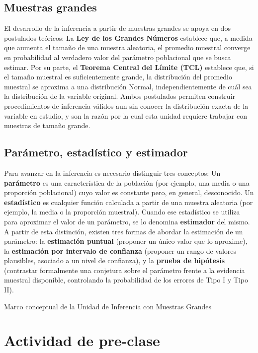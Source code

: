 \documentclass[
  spanish,
  letterpaper,
  DIV=11,
  numbers=noendperiod]{scrreprt}
\begin{document}
\subsection{Muestras grandes}\label{muestras-grandes}

El desarrollo de la inferencia a partir de muestras grandes se apoya en
dos postulados teóricos: La \textbf{Ley de los Grandes Números}
establece que, a medida que aumenta el tamaño de una muestra aleatoria,
el promedio muestral converge en probabilidad al verdadero valor del
parámetro poblacional que se busca estimar. Por su parte, el
\textbf{Teorema Central del Límite (TCL)} establece que, si el tamaño
muestral es suficientemente grande, la distribución del promedio
muestral se aproxima a una distribución Normal, independientemente de
cuál sea la distribución de la variable original. Ambos postulados
permiten construir procedimientos de inferencia válidos aun sin conocer
la distribución exacta de la variable en estudio, y son la razón por la
cual esta unidad requiere trabajar con muestras de tamaño grande.

\subsection{Parámetro, estadístico y
estimador}\label{paruxe1metro-estaduxedstico-y-estimador}

Para avanzar en la inferencia es necesario distinguir tres conceptos: Un
\textbf{parámetro} es una característica de la población (por ejemplo,
una media o una proporción poblacional) cuyo valor es constante pero, en
general, desconocido. Un \textbf{estadístico} es cualquier función
calculada a partir de una muestra aleatoria (por ejemplo, la media o la
proporción muestral). Cuando ese estadístico se utiliza para aproximar
el valor de un parámetro, se lo denomina \textbf{estimador} del mismo. A
partir de esta distinción, existen tres formas de abordar la estimación
de un parámetro: la \textbf{estimación puntual} (proponer un único valor
que lo aproxime), la \textbf{estimación por intervalo de confianza}
(proponer un rango de valores plausibles, asociado a un nivel de
confianza), y la \textbf{prueba de hipótesis} (contrastar formalmente
una conjetura sobre el parámetro frente a la evidencia muestral
disponible, controlando la probabilidad de los errores de Tipo I y Tipo
II).

Marco conceptual de la Unidad de Inferencia con Muestras Grandes

\section{\texorpdfstring{\textbf{Actividad de
pre-clase}}{Actividad de pre-clase}}\label{actividad-de-pre-clase-2}
\end{document}
